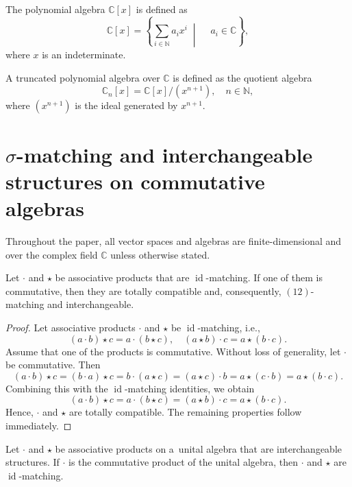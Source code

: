 \documentclass{jonasart}
\DeclareMathOperator{\id}{id}
\begin{document}
	\begin{definition}
		The polynomial algebra $\mathbb{C}[x]$ is defined as
		\[
			\mathbb{C}[x] = \left\{ \sum_{i \in \mathbb{N} } a_i x^i \;\middle|\; \quad a_i \in \mathbb{C} \right\},
		\]
		where $x$ is an indeterminate.
	\end{definition}

	\begin{definition}
		A truncated polynomial algebra over $\mathbb{C}$ is defined as the quotient algebra
		\[
			\mathbb{C}_n [x]=\mathbb{C}[x]\big /(x^{n+1}), \quad n \in \mathbb{N},
		\]
		where $(x^{n+1})$ is the ideal generated by $x^{n+1}.$
	\end{definition}

	\section{\texorpdfstring{$\sigma$-matching and interchangeable structures on commutative algebras}{sigma-matching and interchangeable structures on commutative algebras}}\label{com_a lgebra}

	Throughout the paper, all vector spaces and algebras are finite-dimensional and over the complex field $\mathbb{C}$ unless otherwise stated.

	\begin{lemma}\label{id=interchangeable=total}
		Let $\cdot$ and $\star$ be associative products that are $\id$-matching. If one of them is commutative, then they are totally compatible and, consequently, $(12)$-matching and interchangeable.
	\end{lemma}

	\begin{proof}
		Let associative products $\cdot$ and $\star$ be $\id$-matching, i.e.,
		\[
			(a\cdot b)\star c=a\cdot (b\star c), \quad (a\star b)\cdot c=a\star (b\cdot c).
		\]
		Assume that one of the products is commutative. Without loss of generality, let $\cdot$ be commutative. Then
		\[
			(a\cdot b)\star c = (b\cdot a)\star c
			=b\cdot (a\star c)=(a\star c) \cdot b
			= a\star (c\cdot b)
			=a\star (b\cdot c).
		\]
		Combining this with the $\id$-matching identities, we obtain
		\[
			(a\cdot b)\star c = a\cdot (b\star c) = (a\star b)\cdot c = a\star (b\cdot c).
		\]
		Hence, $\cdot$ and $\star$ are totally compatible. The remaining properties follow immediately.
	\end{proof}

	\begin{lemma}\label{Interchangeable_m utation} Let $\cdot$ and $\star$ be associative products on a~unital algebra that are interchangeable structures. If $\cdot$ is the commutative product of the unital algebra, then $\cdot$ and $\star$ are $\id$-matching.
	\end{lemma}
\end{document}
